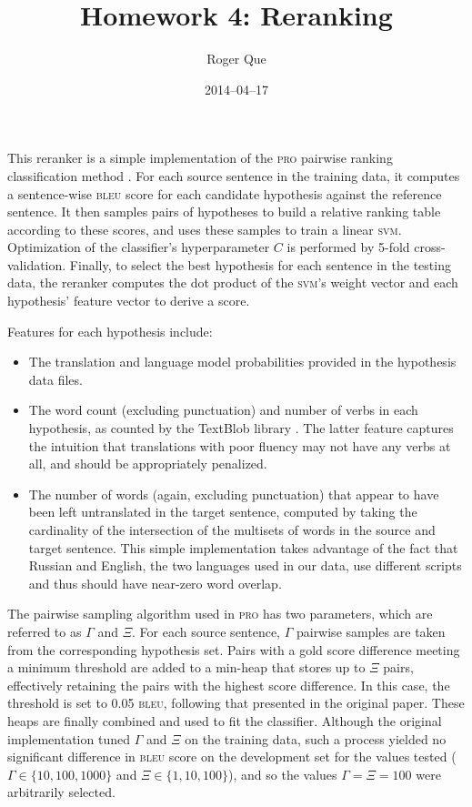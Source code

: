 \documentclass[11pt,twocolumn]{article}
\begin{document}
\title{Homework 4: Reranking}
\author{Roger Que}
\date{2014--04--17}
\maketitle

This reranker is a simple implementation of the \textsc{pro} pairwise
ranking classification method \cite{Hopkins:2011}.
For each source sentence in the training data, it computes a
sentence-wise \textsc{bleu} score for each candidate hypothesis against
the reference sentence.
It then samples pairs of hypotheses to build a relative ranking table
according to these scores, and uses these samples to train a linear
\textsc{svm}.
Optimization of the classifier's hyperparameter $C$ is performed by
5-fold cross-validation.
Finally, to select the best hypothesis for each sentence in the testing
data, the reranker computes the dot product of the \textsc{svm}'s weight
vector and each hypothesis' feature vector to derive a score.

Features for each hypothesis include:
\begin{itemize}
\item
The translation and language model probabilities provided in the
hypothesis data files.

\item
The word count (excluding punctuation) and number of verbs in each
hypothesis, as counted by the TextBlob library \cite{TextBlob}.
The latter feature captures the intuition that translations with poor
fluency may not have any verbs at all, and should be appropriately
penalized.

\item
The number of words (again, excluding punctuation) that appear to have
been left untranslated in the target sentence, computed by taking the
cardinality of the intersection of the multisets of words in the source
and target sentence.
This simple implementation takes advantage of the fact that Russian and
English, the two languages used in our data, use different scripts and
thus should have near-zero word overlap.
\end{itemize}

The pairwise sampling algorithm used in \textsc{pro} has two parameters,
which are referred to as $\Gamma$ and $\Xi$.
For each source sentence, $\Gamma$ pairwise samples are taken from the
corresponding hypothesis set.
Pairs with a gold score difference meeting a minimum threshold are
added to a min-heap that stores up to $\Xi$ pairs, effectively retaining
the pairs with the highest score difference.
In this case, the threshold is set to 0.05 \textsc{bleu}, following
that presented in the original paper.
These heaps are finally combined and used to fit the classifier.
Although the original implementation tuned $\Gamma$ and $\Xi$ on the
training data, such a process yielded no significant difference in
\textsc{bleu} score on the development set for the values tested
($\Gamma\in\{10,100,1000\}$ and $\Xi\in\{1,10,100\}$), and so the values
$\Gamma=\Xi=100$ were arbitrarily selected.
\end{document}
